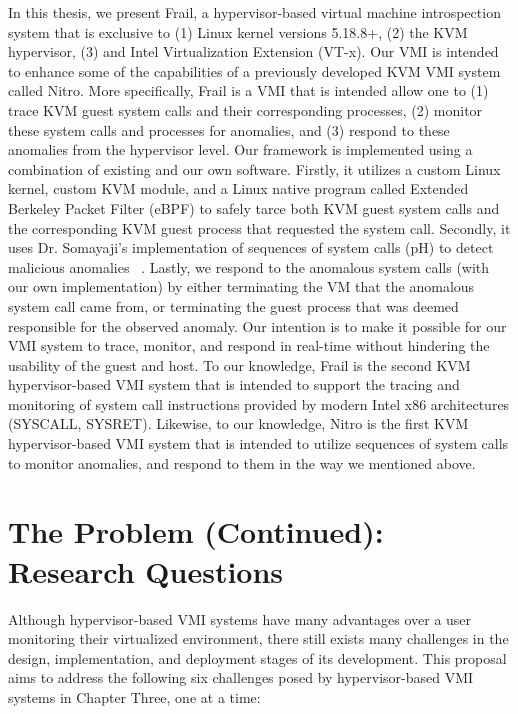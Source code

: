 \documentclass{report}
\begin{document}
\begin{spacing}{1.5}
{\large 
In this thesis, we present Frail, a hypervisor-based virtual machine introspection system that is exclusive to (1) Linux kernel versions 5.18.8+, (2) the KVM hypervisor, (3) and Intel Virtualization Extension (VT-x). Our VMI is intended to enhance some of the capabilities of a previously developed KVM VMI system called Nitro. More specifically, Frail is a VMI that is intended allow one to (1) trace KVM guest system calls and their corresponding processes, (2) monitor these system calls and processes for anomalies, and (3) respond to these anomalies from the hypervisor level. Our framework is implemented using a combination of existing and our own software. Firstly, it utilizes a custom Linux kernel, custom KVM module, and a Linux native program called Extended Berkeley Packet Filter (eBPF) to safely tarce both KVM guest system calls and the corresponding KVM guest process that requested the system call. Secondly, it uses Dr. Somayaji's implementation of sequences of system calls (pH) to detect malicious anomalies ~\cite{somayaji2002operating}. Lastly, we respond to the anomalous system calls (with our own implementation) by either terminating the VM that the anomalous system call came from, or terminating the guest process that was deemed responsible for the observed anomaly. Our intention is to make it possible for our VMI system to trace, monitor, and respond in real-time without hindering the usability of the guest and host. To our knowledge, Frail is the second KVM hypervisor-based VMI system that is intended to support the tracing and monitoring of system call instructions provided by modern Intel x86 architectures (SYSCALL, SYSRET). Likewise, to our knowledge, Nitro is the first KVM hypervisor-based VMI system that is intended to utilize sequences of system calls to monitor anomalies, and respond to them in the way we mentioned above.
\newline
}




\section{The Problem (Continued): Research Questions}

{\large
Although hypervisor-based VMI systems have many advantages over a user monitoring their virtualized environment, there still exists many challenges in the design, implementation, and deployment stages of its development. This proposal aims to address the following six challenges posed by hypervisor-based VMI systems in Chapter Three, one at a time:
\newline
}


\end{spacing}
\end{document}
